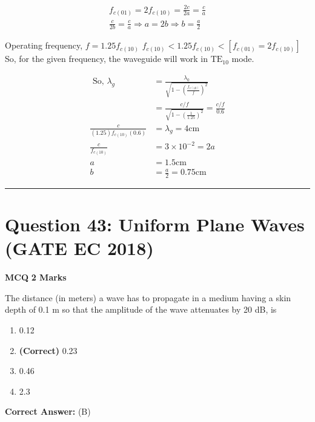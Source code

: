 \documentclass[11pt,a4paper]{article}
\begin{document}
\begin{tcolorbox}[solbox, title=Detailed Solution -- Question 42]
\[
\begin{array}{l} f_{c(01)}=2 f_{c(10)}=\frac{2 c}{2 a}=\frac{c}{a} \\ \frac{c}{2 b}=\frac{c}{a} \Rightarrow a=2 b \Rightarrow b=\frac{a}{2} \end{array}
\]

 Operating frequency,
$f=1.25 f_{c(10)}$
$f_{c(10)}< 1.25 f_{c(10)} < \left[f_{c(01)}=2 f_{c(10)}\right]$
 So, for the given frequency, the waveguide will work in $\mathrm{TE}_{10}$ mode.

\[
\begin{aligned} \text { So, } \lambda_{g} &=\frac{\lambda_{0}}{\sqrt{1-\left(\frac{f_{c(10)}}{f}\right)^{2}}} \\ &=\frac{c / f}{\sqrt{1-\left(\frac{1}{1.25}\right)^{2}}}=\frac{c / f}{0.6} \\ \frac{c}{(1.25) f_{c(10)}(0.6)} &=\lambda_{g}=4 \mathrm{cm} \\ \frac{c}{f_{c(10)}} &=3 \times 10^{-2}=2 a \\ a &=1.5 \mathrm{cm} \\ b &=\frac{a}{2}=0.75 \mathrm{cm} \end{aligned}
\]
\end{tcolorbox}

\vspace{1.5em}
\hrule
\vspace{1.5em}

\section*{Question 43: Uniform Plane Waves (GATE EC 2018)}
\noindent \textbf{\color{primary}MCQ} \hfill \textbf{\color{secondary}2 Marks}


\noindent The distance (in meters) a wave has to propagate in a medium having a skin depth of 0.1 m
so that the amplitude of the wave attenuates by 20 dB, is


\begin{enumerate}[label=(\Alph*)]
    \item 0.12
    \item \textbf{(Correct)} 0.23
    \item 0.46
    \item 2.3
\end{enumerate}

\noindent \textbf{Correct Answer:} (B)
\end{document}
